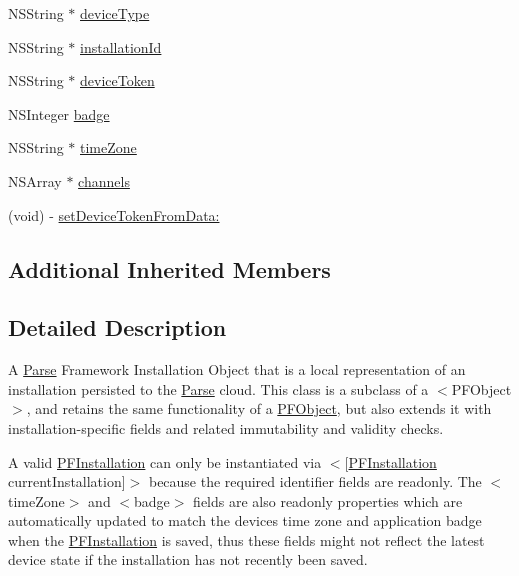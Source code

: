  

 \begin{DoxyCompactItemize}
\item 
N\+S\+String $\ast$ \hyperlink{interface_p_f_installation_afac8d2521c0fd031e204c5642ce271a6}{device\+Type}
\item 
N\+S\+String $\ast$ \hyperlink{interface_p_f_installation_aba5ea4cb6705ac365a6a33fcf775deb8}{installation\+Id}
\item 
N\+S\+String $\ast$ \hyperlink{interface_p_f_installation_a5ea812bfe9db860563f3b672dc657ce7}{device\+Token}
\item 
N\+S\+Integer \hyperlink{interface_p_f_installation_add31abb42268a9d3f2e744de1316f993}{badge}
\item 
N\+S\+String $\ast$ \hyperlink{interface_p_f_installation_adb6faa1119a0a6155940bf6837037bff}{time\+Zone}
\item 
N\+S\+Array $\ast$ \hyperlink{interface_p_f_installation_a6cf5a7c40903cdfba2563ec82fadb3f3}{channels}
\item 
(void) -\/ \hyperlink{interface_p_f_installation_a1c5b6bc17615134289443b4517832c23}{set\+Device\+Token\+From\+Data\+:}
\end{DoxyCompactItemize}
\subsection*{Additional Inherited Members}


\subsection{Detailed Description}
A \hyperlink{interface_parse}{Parse} Framework Installation Object that is a local representation of an installation persisted to the \hyperlink{interface_parse}{Parse} cloud. This class is a subclass of a $<$\+P\+F\+Object$>$, and retains the same functionality of a \hyperlink{interface_p_f_object}{P\+F\+Object}, but also extends it with installation-\/specific fields and related immutability and validity checks.

A valid {\ttfamily \hyperlink{interface_p_f_installation}{P\+F\+Installation}} can only be instantiated via $<$\mbox{[}\hyperlink{interface_p_f_installation}{P\+F\+Installation} current\+Installation\mbox{]}$>$ because the required identifier fields are readonly. The $<$time\+Zone$>$ and $<$badge$>$ fields are also readonly properties which are automatically updated to match the device\textquotesingle{}s time zone and application badge when the {\ttfamily \hyperlink{interface_p_f_installation}{P\+F\+Installation}} is saved, thus these fields might not reflect the latest device state if the installation has not recently been saved.


